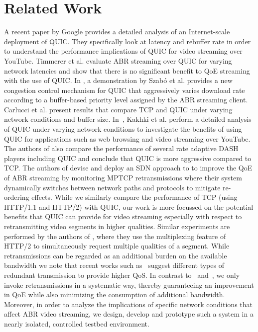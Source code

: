 \section{Related Work}
\label{sec:relatedwork}
A recent paper by Google \cite{Langley:SIGCOMM:2017} provides a detailed analysis of an Internet-scale deployment of QUIC. They specifically look at latency and rebuffer rate in order to understand the performance implications of QUIC for video streaming over YouTube. Timmerer et al. \cite{timmerer2016advanced} evaluate ABR streaming over QUIC for varying network latencies and show that there is no significant benefit to QoE streaming with the use of QUIC. In \cite{szaboquic}, a demonstration by Szab\'o et al. provides a new congestion control mechanism for QUIC that aggressively varies download rate according to a buffer-based priority level assigned by the ABR streaming client.
Carlucci et al. \cite{Carlucci:2015} present results that compare TCP and QUIC under varying network conditions and buffer size. In~\cite{Kakhki:IMC:2017}, Kakhki et al. perform a detailed analysis of QUIC under varying network conditions to investigate the benefits of using QUIC for applications such as web browsing and video streaming over YouTube. The authors of \cite{AYAD201890} also compare the performance of several rate adaptive DASH players including QUIC and conclude that QUIC is more aggressive compared to TCP. The authors of \cite{BHayes} devise and deploy an SDN approach to to improve the QoE of ABR streaming by monitoring MPTCP retransmissions where their system dynamically switches between network paths and protocols to mitigate re-ordering effects. While we similarly compare the performance of TCP (using HTTP/1.1 and HTTP/2) with QUIC, our work is more focussed on the potential benefits that QUIC can provide for video streaming especially with respect to retransmitting video segments in higher qualities. Similar experiments are performed by the authors of \cite{huysegems2015http}, where they use the multiplexing feature of HTTP/2 to simultaneously request multiple qualities of a segment. While retransmissions can be regarded as an additional burden on the available bandwidth we note that recent works such as~\cite{Vulimiri:CoNext} suggest different types of redundant transmission to provide higher QoS. In contrast to~\cite{huysegems2015http} and~\cite{Vulimiri:CoNext}, we only invoke retransmissions in a systematic way, thereby guaranteeing an improvement in QoE while also minimizing the consumption of additional bandwidth. Moreover, in order to analyze the implications of specific network conditions that affect ABR video streaming, we design, develop and prototype such a system in a nearly isolated, controlled testbed environment.

